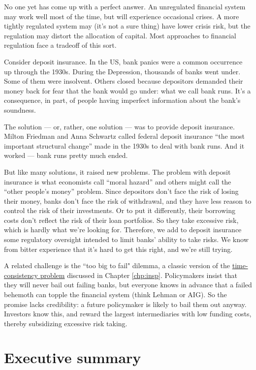 No one yet has come up with a perfect answer.
An unregulated financial system may work well most of the time,
but will experience occasional crises.
A more tightly regulated system may (it's not a sure thing)
have lower crisis risk, but the regulation may distort
the allocation of capital.
Most approaches to financial regulation face a tradeoff of this sort.

Consider deposit insurance.
In the US, bank panics were a common occurrence
up through the 1930s.
During the Depression,
thousands of banks went under.
Some of them were insolvent.
Others closed because depositors demanded their money back
for fear that the bank would go under:
what we call bank runs.
It's a consequence, in part, of people having imperfect
information about the bank's soundness.

The solution --- or, rather, one solution --- was to provide deposit insurance.
Milton Friedman and Anna Schwartz called federal
deposit insurance ``the most important structural change''
made in the 1930s to deal with bank runs.
And it worked --- bank runs pretty much ended.

But like many solutions, it raised new problems.
The problem with deposit insurance is what economists call ``moral hazard''
and others might call the ``other people's money'' problem.
Since depositors don't face the risk of losing their money,
banks don't face the risk of withdrawal,
and they have less reason to control the risk of their investments.
Or to put it differently, their borrowing costs don't reflect the risk
of their loan portfolios.
So they take excessive risk, which is hardly what we're looking for.
Therefore, we add to deposit insurance some regulatory oversight intended
to limit banks' ability to take risks.
We know from bitter experience that it's hard to get this right,
and we're still trying.

A related challenge is the ``too big to fail" dilemma, a classic version
of the \hyperref[sec:time_cons]{time-consistency problem} discussed in Chapter \ref{chp:insp}.
Policymakers insist that they
will never bail out failing banks, but everyone
knows in advance that a failed behemoth can topple the financial system
(think Lehman or AIG).
So the promise lacks credibility: a future policymaker is likely to bail them out anyway.
Investors know this, and reward the largest intermediaries with low funding costs,
thereby subsidizing excessive risk taking.

\section*{Executive summary}

